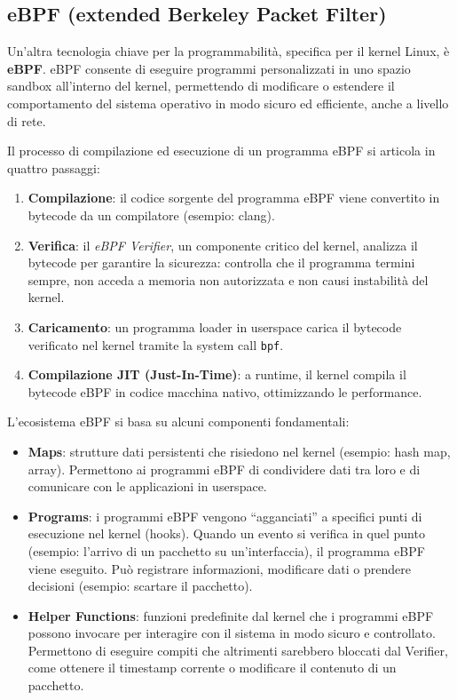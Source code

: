 \subsection{eBPF (extended Berkeley Packet Filter)}

Un'altra tecnologia chiave per la programmabilità, specifica per il kernel
Linux, è \textbf{eBPF}. eBPF consente di eseguire programmi personalizzati
in uno spazio sandbox all'interno del kernel, permettendo di modificare o
estendere il comportamento del sistema operativo in modo sicuro ed efficiente,
anche a livello di rete.

Il processo di compilazione ed esecuzione di un programma eBPF si articola
in quattro passaggi:

\begin{enumerate}
\item \textbf{Compilazione}: il codice sorgente del programma eBPF viene
convertito in bytecode da un compilatore (esempio: clang).
\item \textbf{Verifica}: il \textit{eBPF Verifier}, un componente critico
del kernel, analizza il bytecode per garantire la sicurezza: controlla che
il programma termini sempre, non acceda a memoria non autorizzata e non
causi instabilità del kernel.
\item \textbf{Caricamento}: un programma loader in userspace carica il
bytecode verificato nel kernel tramite la system call \texttt{bpf}.
\item \textbf{Compilazione JIT (Just-In-Time)}: a runtime, il kernel
compila il bytecode eBPF in codice macchina nativo, ottimizzando le
performance.
\end{enumerate}

L'ecosistema eBPF si basa su alcuni componenti fondamentali:

\begin{itemize}
\item \textbf{Maps}: strutture dati persistenti che risiedono nel kernel
(esempio: hash map, array). Permettono ai programmi eBPF di condividere
dati tra loro e di comunicare con le applicazioni in userspace.
\item \textbf{Programs}: i programmi eBPF vengono ``agganciati'' a
specifici punti di esecuzione nel kernel (hooks). Quando un evento si
verifica in quel punto (esempio: l'arrivo di un pacchetto su un'interfaccia),
il programma eBPF viene eseguito. Può registrare informazioni, modificare
dati o prendere decisioni (esempio: scartare il pacchetto).
\item \textbf{Helper Functions}: funzioni predefinite dal kernel che i
programmi eBPF possono invocare per interagire con il sistema in modo
sicuro e controllato. Permettono di eseguire compiti che altrimenti
sarebbero bloccati dal Verifier, come ottenere il timestamp corrente o
modificare il contenuto di un pacchetto.
\end{itemize}
